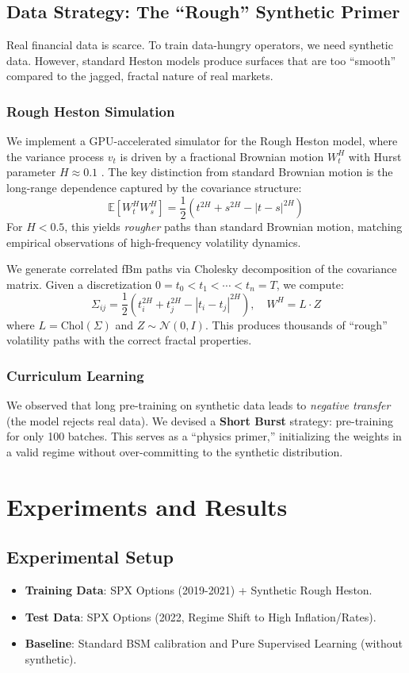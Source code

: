 \documentclass{article}
\begin{document}
\subsection{Data Strategy: The ``Rough'' Synthetic Primer}
Real financial data is scarce. To train data-hungry operators, we need synthetic data. However, standard Heston models produce surfaces that are too ``smooth'' compared to the jagged, fractal nature of real markets.

\subsubsection{Rough Heston Simulation}
We implement a GPU-accelerated simulator for the Rough Heston model, where the variance process \(v_t\) is driven by a fractional Brownian motion \(W^H_t\) with Hurst parameter \(H \approx 0.1\) \citep{rosenbaum2018rough}. The key distinction from standard Brownian motion is the long-range dependence captured by the covariance structure:
\[
    \mathbb{E}[W^H_t W^H_s] = \frac{1}{2}\left(t^{2H} + s^{2H} - |t-s|^{2H}\right)
\]
For \(H < 0.5\), this yields \emph{rougher} paths than standard Brownian motion, matching empirical observations of high-frequency volatility dynamics.

We generate correlated fBm paths via Cholesky decomposition of the covariance matrix. Given a discretization \(0 = t_0 < t_1 < \cdots < t_n = T\), we compute:
\[
    \Sigma_{ij} = \frac{1}{2}\left(t_i^{2H} + t_j^{2H} - |t_i - t_j|^{2H}\right), \quad W^H = L \cdot Z
\]
where \(L = \text{Chol}(\Sigma)\) and \(Z \sim \mathcal{N}(0, I)\). This produces thousands of ``rough'' volatility paths with the correct fractal properties.

\subsubsection{Curriculum Learning}
We observed that long pre-training on synthetic data leads to \emph{negative transfer} (the model rejects real data). We devised a \textbf{Short Burst} strategy: pre-training for only 100 batches. This serves as a ``physics primer,'' initializing the weights in a valid regime without over-committing to the synthetic distribution.

\section{Experiments and Results}

\subsection{Experimental Setup}
\begin{itemize}
    \item \textbf{Training Data}: SPX Options (2019-2021) + Synthetic Rough Heston.
    \item \textbf{Test Data}: SPX Options (2022, Regime Shift to High Inflation/Rates).
    \item \textbf{Baseline}: Standard BSM calibration and Pure Supervised Learning (without synthetic).
\end{itemize}
\end{document}
